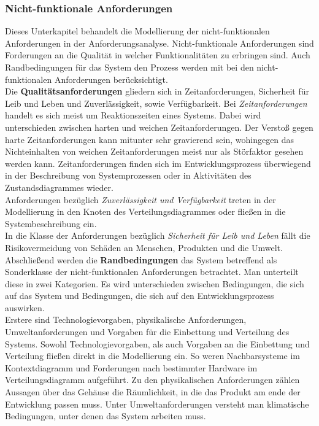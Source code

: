 \documentclass[../../../Bachelorarbeit.tex]{subfiles}
\begin{document}
\subsubsection{Nicht-funktionale Anforderungen}
Dieses Unterkapitel behandelt die Modellierung der nicht-funktionalen Anforderungen in der Anforderungsanalyse. Nicht-funktionale Anforderungen sind Forderungen an die Qualität in welcher Funktionalitäten zu erbringen sind. Auch Randbedingungen für das System \bzw den Prozess werden mit bei den nicht-funktionalen Anforderungen berücksichtigt.\\ %
Die \textbf{Qualitätsanforderungen} gliedern sich in Zeitanforderungen, Sicherheit für Leib und Leben und Zuverlässigkeit, sowie Verfügbarkeit. Bei \textit{Zeitanforderungen} handelt es sich meist um Reaktionszeiten eines Systems. Dabei wird unterschieden zwischen harten und weichen Zeitanforderungen. Der Verstoß gegen harte Zeitanforderungen kann mitunter sehr gravierend sein, wohingegen das Nichteinhalten von weichen Zeitanforderungen meist nur als Störfaktor gesehen werden kann. Zeitanforderungen finden sich im Entwicklungsprozess überwiegend in der Beschreibung von Systemprozessen oder in Aktivitäten des Zustandsdiagrammes wieder.\\
Anforderungen bezüglich \textit{Zuverlässigkeit und Verfügbarkeit} treten in der Modellierung in den Knoten des Verteilungsdiagrammes oder fließen in die Systembeschreibung ein.\\
In die Klasse der Anforderungen bezüglich \textit{Sicherheit für Leib und Leben} fällt die Risikovermeidung von Schäden an Menschen, Produkten und die Umwelt.\\
Abschließend werden die \textbf{Randbedingungen} das System betreffend als Sonderklasse der nicht-funktionalen Anforderungen betrachtet. Man unterteilt diese in zwei Kategorien. Es wird unterschieden zwischen Bedingungen, die sich auf das System und Bedingungen, die sich auf den Entwicklungsprozess auswirken.\\
Erstere sind Technologievorgaben, physikalische Anforderungen, Umweltanforderungen und Vorgaben für die Einbettung und Verteilung des Systems. Sowohl Technologievorgaben, als auch Vorgaben an die Einbettung und Verteilung fließen direkt in die Modellierung ein. So weren \bspw Nachbarsysteme im Kontextdiagramm und Forderungen nach bestimmter Hardware im Verteilungsdiagramm aufgeführt. Zu den physikalischen Anforderungen zählen \zB Aussagen über das Gehäuse \bzw die Räumlichkeit, in die das Produkt am ende der Entwicklung passen muss. Unter Umweltanforderungen versteht man \bspw klimatische Bedingungen, unter denen das System arbeiten muss.\\
\end{document}
